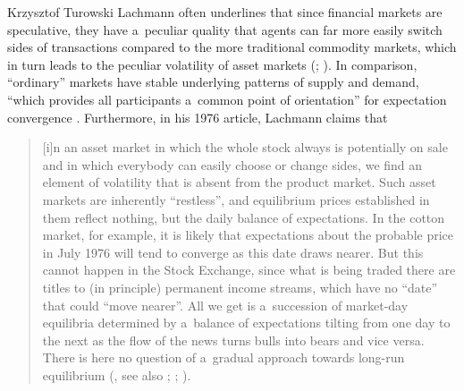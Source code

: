 \begin{artengenv}{Krzysztof Turowski}
Lachmann often underlines that since financial markets are speculative, they have a~peculiar quality that agents can far more easily switch sides of transactions compared to the more traditional commodity markets, which in turn leads to the peculiar volatility of asset markets (\cite[42]{lachmann1986market}; \citeyear[267]{lachmann-speculative-markets}).
In comparison, ``ordinary'' markets have stable underlying patterns of supply and demand, ``which provides all participants a~common point of orientation'' for expectation convergence \parencite[264]{lachmann-speculative-markets}.
Furthermore, in his 1976 article, Lachmann claims that
\begin{quote}
[i]n an asset market in which the whole stock always is potentially on sale and in which everybody can easily choose or change sides, we find an element of volatility that is absent from the product market. Such asset markets are inherently ``restless'', and equilibrium prices established in them reflect nothing, but the daily balance of expectations. In the cotton market, for example, it is likely that expectations about the probable price in July 1976 will tend to converge as this date draws nearer. But this cannot happen in the Stock Exchange, since what is being traded there are titles to (in principle) permanent income streams, which have no ``date'' that could ``move nearer''. All we get is a~succession of market-day equilibria determined by a~balance of expectations tilting from one day to the next as the flow of the news turns bulls into bears and vice versa. There is here no question of a~gradual approach towards long-run equilibrium (\cite[60]{lachmann-kaleidic}, see also \cite[202]{lachmann-hayek}; \citeyear[161--162]{lachmann-individualism}; \citeyear[264]{lachmann-speculative-markets}).
\end{quote}


\end{artengenv}
